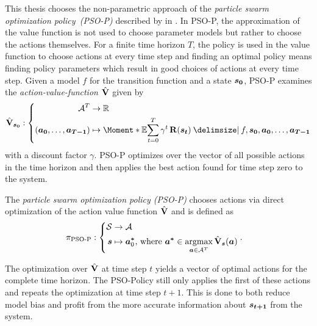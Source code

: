 This thesis chooses the non-parametric approach of the \emph{particle swarm optimization policy~(PSO-P)} described by \citeauthor{hein_reinforcement_2016} in \cite{hein_reinforcement_2016}.
In PSO-P, the approximation of the value function is not used to choose parameter models but rather to choose the actions themselves.
For a finite time horizon $T$, the policy is used in the value function to choose actions at every time step and finding an optimal policy means finding policy parameters which result in good choices of actions at every time step.
Given a model $f$ for the transition function and a state $\bm{s_0}$, PSO-P examines the \emph{action-value-function $\hat{\operatorname{\mathbf{V}}}$} given by
\begin{align}
    \hat{\Vlu}_{\mat{s_0}} : \left\{
        \begin{aligned}
            \Ah^T &\to \R \\
            \left( \mat{a_0}, \dots, \mat{a_{T-1}} \right) &\mapsto \Moment*{\E}{\sum_{t=0}^T \gamma^t \Rwd(\mat{s_t}) \given f, \mat{s_0}, \mat{a_0}, \dots, \mat{a_{T-1}}}
        \end{aligned}
    \right.
\end{align}
with a discount factor $\gamma$.
PSO-P optimizes over the vector of all possible actions in the time horizon and then applies the best action found for time step zero to the system.
\begin{definition}[PSO-P]
    \label{def:psop}
    The \emph{particle swarm optimization policy (PSO-P)} \cite{hein_reinforcement_2016} chooses actions via direct optimization of the action value function $\hat{\operatorname{\mathbf{V}}}$ and is defined as
    \begin{align}
        \pi_{\text{PSO-P}} &: \left\{
            \begin{aligned}
                \Es &\to \Ah\\
                \mat{s} &\mapsto \mat{a^\ast}_0 \text{, where } \mat{a^\ast} \in \argmax_{\mat{a} \in \Ah^T} \hat{\Vlu}_{\mat{s}}(\mat{a})
            \end{aligned}
        \right..
    \end{align}
\end{definition}
The optimization over $\hat{\operatorname{\mathbf{V}}}$ at time step $t$ yields a vector of optimal actions for the complete time horizon.
The PSO-Policy still only applies the first of these actions and repeats the optimization at time step $t+1$.
This is done to both reduce model bias and profit from the more accurate information about $\bm{s_{t+1}}$ from the system.

